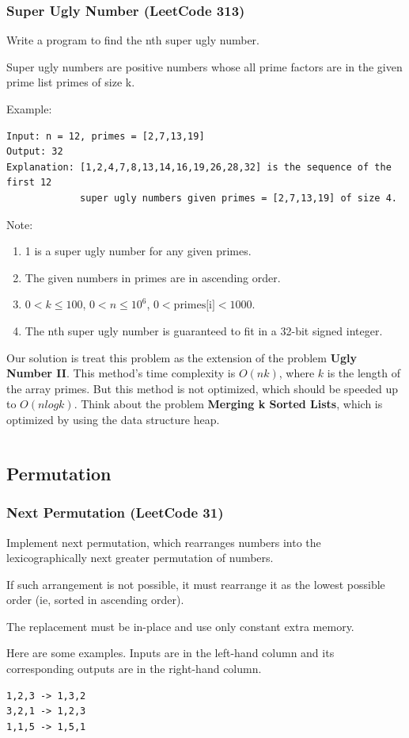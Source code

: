 \documentclass[11pt]{article}
\begin{document}
\subsubsection{Super Ugly Number (LeetCode 313)}
Write a program to find the nth super ugly number.

Super ugly numbers are positive numbers whose all prime factors are in the given prime list primes of size k.

Example:
\begin{verbatim}
Input: n = 12, primes = [2,7,13,19]
Output: 32 
Explanation: [1,2,4,7,8,13,14,16,19,26,28,32] is the sequence of the first 12 
             super ugly numbers given primes = [2,7,13,19] of size 4.
\end{verbatim}
Note:
\begin{enumerate}
	\item 1 is a super ugly number for any given primes.
	\item The given numbers in primes are in ascending order.
	\item $0 < k \leq 100$, $0 < n \leq 10^6$, $0 < \text{primes[i]} < 1000$.
	\item The nth super ugly number is guaranteed to fit in a 32-bit signed integer.
\end{enumerate}

Our solution is treat this problem as the extension of the problem \textbf{Ugly Number II}. 
This method's time complexity is $O(nk)$, where $k$ is the length of the array primes. 
But this method is not optimized, which should be speeded up to $O(n log k)$. 
Think about the problem \textbf{Merging k Sorted Lists}, which is optimized by using the data structure heap. 

\inputminted[breaklines=true,frame=leftline, linenos=true]{python}{src/nthSuperUglyNumber.py}

\subsection{Permutation}
\subsubsection{Next Permutation (LeetCode 31)}
Implement next permutation, which rearranges numbers into the lexicographically next greater permutation of numbers.

If such arrangement is not possible, it must rearrange it as the lowest possible order (ie, sorted in ascending order).

The replacement must be in-place and use only constant extra memory.

Here are some examples. Inputs are in the left-hand column and its corresponding outputs are in the right-hand column.
\begin{verbatim}
1,2,3 -> 1,3,2
3,2,1 -> 1,2,3
1,1,5 -> 1,5,1	
\end{verbatim}
\end{document}
